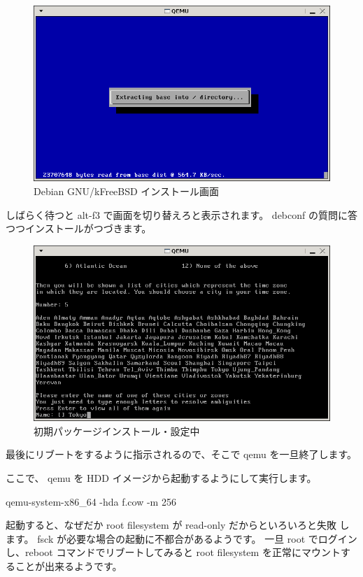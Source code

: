 \documentclass[mingoth,a4paper]{jsarticle}
\begin{document}
\begin{figure}[H]
\begin{multicols}{2}
 \includegraphics[width=\hsize]{image200708/kfreebsd-install-3.png}
 \end{multicols}
\caption{Debian GNU/kFreeBSD インストール画面}
\label{fig:kfreebsdinst}
\end{figure}

しばらく待つと alt-f3 で画面を切り替えろと表示されます。
debconf の質問に答つつインストールがつづきます。

\begin{figure}[H]
 \begin{center}
  \includegraphics[width=0.5\hsize]{image200708/kfreebsd-install-4.png}
 \end{center}
 \caption{初期パッケージインストール・設定中}
 \label{fig:kfreebsdinst2}
\end{figure}

最後にリブートをするように指示されるので、そこで
qemu を一旦終了します。

ここで、 qemu を HDD イメージから起動するようにして実行します。

\begin{commandline}
 qemu-system-x86_64 -hda f.cow -m 256 
\end{commandline}

起動すると、なぜだか root filesystem が read-only だからといろいろと失敗
します。
fsck が必要な場合の起動に不都合があるようです。
一旦 root でログインし、reboot コマンドでリブートしてみると root
filesystem を正常にマウントすることが出来るようです。
\end{document}

